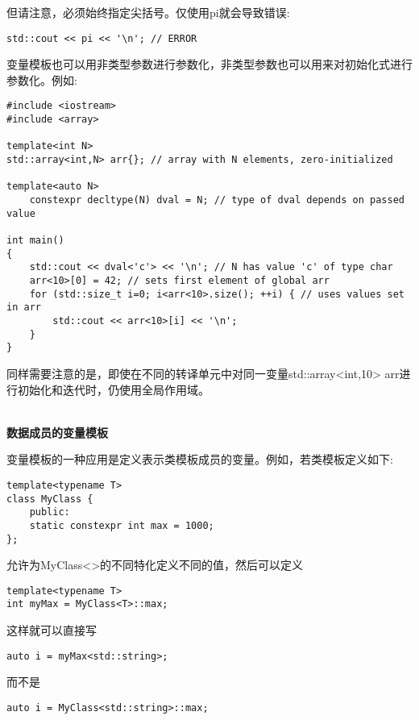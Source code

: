 但请注意，必须始终指定尖括号。仅使用pi就会导致错误:

\begin{lstlisting}[style=styleCXX]
std::cout << pi << '\n'; // ERROR
\end{lstlisting}

变量模板也可以用非类型参数进行参数化，非类型参数也可以用来对初始化式进行参数化。例如:

\begin{lstlisting}[style=styleCXX]
#include <iostream>
#include <array>

template<int N>
std::array<int,N> arr{}; // array with N elements, zero-initialized

template<auto N>
	constexpr decltype(N) dval = N; // type of dval depends on passed value

int main()
{
	std::cout << dval<'c'> << '\n'; // N has value 'c' of type char
	arr<10>[0] = 42; // sets first element of global arr
	for (std::size_t i=0; i<arr<10>.size(); ++i) { // uses values set in arr
		std::cout << arr<10>[i] << '\n';
	}
}
\end{lstlisting}

同样需要注意的是，即使在不同的转译单元中对同一变量std::array<int,10> arr进行初始化和迭代时，仍使用全局作用域。

\hspace*{\fill} \\ %
\noindent
\textbf{数据成员的变量模板}

变量模板的一种应用是定义表示类模板成员的变量。例如，若类模板定义如下:

\begin{lstlisting}[style=styleCXX]
template<typename T>
class MyClass {
	public:
	static constexpr int max = 1000;
};
\end{lstlisting}

允许为MyClass<>的不同特化定义不同的值，然后可以定义

\begin{lstlisting}[style=styleCXX]
template<typename T>
int myMax = MyClass<T>::max;
\end{lstlisting}

这样就可以直接写

\begin{lstlisting}[style=styleCXX]
auto i = myMax<std::string>;
\end{lstlisting}

而不是

\begin{lstlisting}[style=styleCXX]
auto i = MyClass<std::string>::max;
\end{lstlisting}

